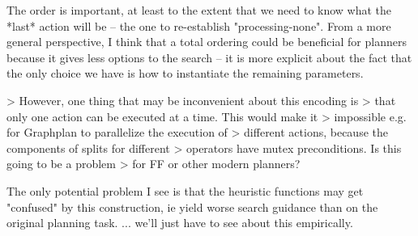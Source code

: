 {The order is important, at least to the extent that we need to know
what the *last* action will be -- the one to re-establish
"processing-none". From a more general perspective, I think that a
total ordering could be beneficial for planners because it gives less
options to the search -- it is more explicit about the fact that the
only choice we have is how to instantiate the remaining parameters.

> However, one thing that may be inconvenient about this encoding is
> that only one action can be executed at a time. This would make it
> impossible e.g. for Graphplan to parallelize the execution of
> different actions, because the components of splits for different
> operators have mutex preconditions. Is this going to be a problem
> for FF or other modern planners?

The only potential problem I see is that the heuristic functions may
get "confused" by this construction, ie yield worse search guidance
than on the original planning task. ... we'll just have to see about
this empirically.
}
